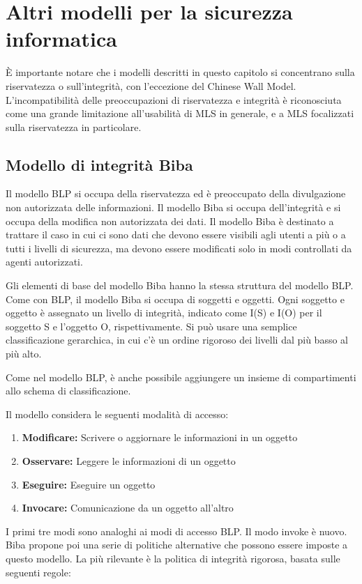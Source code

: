\section{Altri modelli per la sicurezza informatica}
È importante notare che i modelli descritti in questo capitolo si concentrano sulla riservatezza o sull'integrità, con l'eccezione del Chinese Wall Model. L'incompatibilità delle preoccupazioni di riservatezza e integrità è riconosciuta come una grande limitazione all'usabilità di MLS in generale, e a MLS focalizzati sulla riservatezza in particolare.
\subsection{Modello di integrità Biba}
Il modello BLP si occupa della riservatezza ed è preoccupato della divulgazione non autorizzata delle informazioni. Il modello Biba si occupa dell'integrità e si occupa della modifica non autorizzata dei dati. Il modello Biba è destinato a trattare il caso in cui ci sono dati che devono essere visibili agli utenti a più o a tutti i livelli di sicurezza, ma devono essere modificati solo in modi controllati da agenti autorizzati.

\singlespacing

Gli elementi di base del modello Biba hanno la stessa struttura del modello BLP. Come con BLP, il modello Biba si occupa di soggetti e oggetti. Ogni soggetto e oggetto è assegnato un livello di integrità, indicato come I(S) e I(O) per il soggetto S e l'oggetto O, rispettivamente. Si può usare una semplice classificazione gerarchica, in cui c'è un ordine rigoroso dei livelli dal più basso al più alto.

\singlespacing

Come nel modello BLP, è anche possibile aggiungere un insieme di compartimenti allo schema di classificazione. 

\singlespacing

Il modello considera le seguenti modalità di accesso:

\begin{enumerate}
    \item \textbf{Modificare:} Scrivere o aggiornare le informazioni in un oggetto
    
    \item \textbf{Osservare:} Leggere le informazioni di un oggetto
    
    \item \textbf{Eseguire:} Eseguire un oggetto
    
    \item \textbf{Invocare:} Comunicazione da un oggetto all'altro
\end{enumerate}
I primi tre modi sono analoghi ai modi di accesso BLP. Il modo invoke è nuovo. Biba propone poi una serie di politiche alternative che possono essere imposte a questo modello. La più rilevante è la politica di integrità rigorosa, basata sulle seguenti regole:

